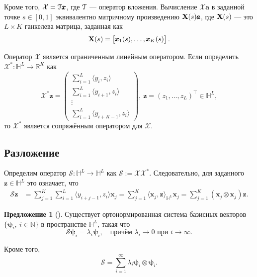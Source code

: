 \documentclass[12pt, specialist, subf
]{disser}
\theoremstyle{definition}
\newtheorem{proposition}{Предложение}
\begin{document}
Кроме того, $\mathcal{X}=\EuScript{T}\pmb {x}$, где $\EuScript{T}$ — оператор вложения. Вычисление $\mathcal{X} \pmb{a}$ в заданной точке $s\in [0,1]$ эквивалентно матричному произведению ${\bf X}(s)\pmb{a}$, где ${\bf X}(s)$ — это $L \times K$ ганкелева матрица, заданная как
\begin{equation}\label{ftraj}
	{\bf X}(s)=\begin{bmatrix} {\pmb x}_1(s), \ldots, {\pmb x}_K(s) \end{bmatrix}.
\end{equation}


Оператор $\mathcal{X}$ является ограниченным линейным оператором. Если определить $\mathcal{X}^*:\mathbb{H}^L \rightarrow \mathbb{R}^K$ как
\begin{equation}
	\mathcal{X}^*{\pmb z}=
	\begin{pmatrix} \sum_{i=1}^L \langle y_i, z_i\rangle\\ \sum_{i=1}^L \langle y_{i+1}, z_i\rangle\\ \vdots\\ \sum_{i=1}^L \langle y_{i+K-1}, z_i\rangle \end{pmatrix},
	\ {\pmb z}=\left(z_1,\ldots, z_L\right)^\top\in\mathbb{H}^L,
\end{equation}
то $\mathcal{X}^*$ является сопряжённым оператором для $\mathcal{X}$.

\subsection*{Разложение}
Определим оператор $\mathcal{S}: \mathbb{H}^L\rightarrow \mathbb{H}^L$ как $\mathcal{S}:=\mathcal{X}\mathcal{X}^*$. Следовательно, для заданного ${\pmb z}\in \mathbb{H}^{L}$ это означает, что
\begin{align}\label{eq: s-operator}
	\mathcal{S}{\pmb z} &
	=\sum_{j=1}^K\sum_{i=1}^L \langle y_{i+j-1} , z_i \rangle {\pmb x}_j
	=\sum_{j=1}^K \langle {\pmb x}_j , {\pmb z} \rangle_{\mathbb{H}^L} {\pmb x}_j
	=\sum_{j=1}^K ({\pmb x}_j \otimes {\pmb x}_j) {\pmb z}.
\end{align}


\begin{proposition}[{\cite[Раздел~3.1]{haghbin2019functionalsingularspectrumanalysis}}]
	Существует ортонормированная система базисных векторов $\{\boldsymbol{\psi}_{i},\ i\in\mathbb{N}\}$ в пространстве $\mathbb{H}^{L}$, такая что
\[
\boldsymbol{\mathcal{S}}\boldsymbol{\psi}_{i} = \lambda_{i}\boldsymbol{\psi}_{i}, \quad \text{причём } \lambda_{i} \to 0 \text{ при } i \to \infty.
\]

Кроме того, 
\[
\boldsymbol{\mathcal{S}} = \sum_{i=1}^{\infty} \lambda_{i} \boldsymbol{\psi}_{i} \otimes \boldsymbol{\psi}_{i}.
\]
\end{proposition}
\end{document}
